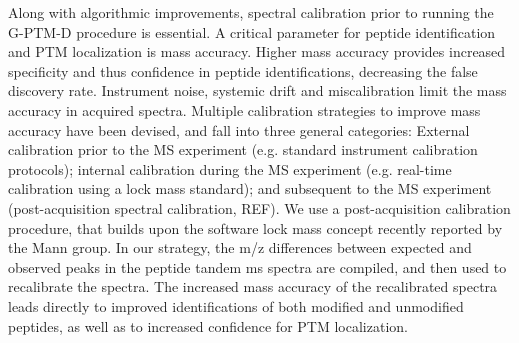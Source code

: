 \documentclass[journal=jprobs,manuscript=article]{achemso}
\begin{document}
Along with algorithmic improvements, spectral calibration prior to running the G-PTM-D procedure is essential.
A critical parameter for peptide identification and PTM localization is mass accuracy\cite{Scherl_2008}.
Higher mass accuracy provides increased specificity and thus confidence in peptide identifications, decreasing the false discovery rate.
Instrument noise, systemic drift and miscalibration limit the mass accuracy in acquired spectra.
Multiple calibration strategies to improve mass accuracy have been devised, and fall into three general categories:  External calibration prior to the MS experiment (e.g. standard instrument calibration protocols); internal calibration during the MS experiment (e.g. real-time calibration using a lock mass standard\cite{Olsen_2005}); and subsequent to the MS experiment (post-acquisition spectral calibration, REF).
We use a post-acquisition calibration procedure, that builds upon the software lock mass concept\cite{Cox_2011} recently reported by the Mann group.
In our strategy, the m/z differences between expected and observed peaks in the peptide tandem ms spectra are compiled, and then used to recalibrate the spectra.
The increased mass accuracy of the recalibrated spectra leads directly to improved identifications of both modified and unmodified peptides, as well as to increased confidence for PTM localization.
\end{document}
